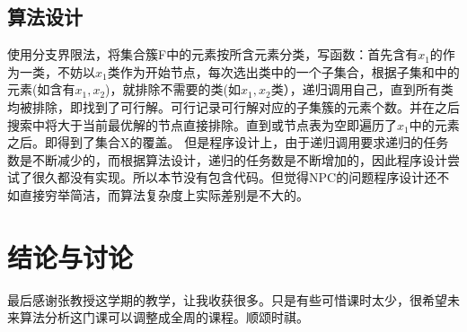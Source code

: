 \documentclass[UTF8]{ctexart}
\begin{document}
\subsection{算法设计}
使用分支界限法，将集合簇F中的元素按所含元素分类，写函数：首先含有$x_{1}$的作为一类，不妨以$x_{1}$类作为开始节点，每次选出类中的一个子集合，根据子集和中的元素(如含有$x_{1},x_{2}$)，就排除不需要的类(如$x_{1},x_{2}$类），递归调用自己，直到所有类均被排除，即找到了可行解。可行记录可行解对应的子集簇的元素个数。并在之后搜索中将大于当前最优解的节点直接排除。直到或节点表为空即遍历了$x_{1}$中的元素之后。即得到了集合X的覆盖。
但是程序设计上，由于递归调用要求递归的任务数是不断减少的，而根据算法设计，递归的任务数是不断增加的，因此程序设计尝试了很久都没有实现。所以本节没有包含代码。但觉得NPC的问题程序设计还不如直接穷举简洁，而算法复杂度上实际差别是不大的。



\newpage
\section{结论与讨论}


最后感谢张教授这学期的教学，让我收获很多。只是有些可惜课时太少，很希望未来算法分析这门课可以调整成全周的课程。顺颂时祺。
\end{document}
